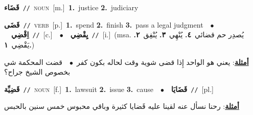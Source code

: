 \documentclass[10pt,a4paper,twoside]{article} %
\begin{document}
\begin{multicols}{2}
{\setlength\topsep{0pt}\textbf{\foreignlanguage{arabic}{قَضَاء}}\ {\color{gray}\texttt{//}\color{black}}\ \textsc{noun}\ [m.]\ \textbf{1.}~justice  \textbf{2.}~judiciary\ } \vspace{2mm}

{\setlength\topsep{0pt}\textbf{\foreignlanguage{arabic}{قَضَى}}\ {\color{gray}\texttt{//}\color{black}}\ \textsc{verb}\ [p.]\ \textbf{1.}~spend  \textbf{2.}~finish  \textbf{3.}~pass a legal judgment\ \ $\bullet$\ \ \setlength\topsep{0pt}\textbf{\foreignlanguage{arabic}{اِقْضِي}}\ {\color{gray}\texttt{//}\color{black}}\ [c.]\ \ $\bullet$\ \ \setlength\topsep{0pt}\textbf{\foreignlanguage{arabic}{يِقْضِي}}\ {\color{gray}\texttt{//}\color{black}}\ [i.]\ \color{gray}(msa. \foreignlanguage{arabic}{يُصدِر حم قضائي}~\foreignlanguage{arabic}{\textbf{٤.}}  \foreignlanguage{arabic}{يُنْهِي}~\foreignlanguage{arabic}{\textbf{٣.}}  \foreignlanguage{arabic}{يُنْفِق}~\foreignlanguage{arabic}{\textbf{٢.}}  \foreignlanguage{arabic}{يَقْضِي}~\foreignlanguage{arabic}{\textbf{١.}})\color{black}\  \begin{flushright}\color{gray}\foreignlanguage{arabic}{\textbf{\underline{\foreignlanguage{arabic}{أمثلة}}}: يعني هو الواحد إِذا قضى شوية وقت لحاله بكون كفر\ $\bullet$\ \  قضت المحكمة شي بخصوص الشيخ جراح؟}\end{flushright}\color{black}} \vspace{2mm}

{\setlength\topsep{0pt}\textbf{\foreignlanguage{arabic}{قَضِيِّة}}\ {\color{gray}\texttt{//}\color{black}}\ \textsc{noun}\ [f.]\ \textbf{1.}~lawsuit  \textbf{2.}~issue  \textbf{3.}~cause\ \ $\bullet$\ \ \setlength\topsep{0pt}\textbf{\foreignlanguage{arabic}{قَضَايَا}}\ {\color{gray}\texttt{//}\color{black}}\ [pl.]\  \begin{flushright}\color{gray}\foreignlanguage{arabic}{\textbf{\underline{\foreignlanguage{arabic}{أمثلة}}}: رحنا نسأل عنه لقينا عليه قَضايا كثيرة وباقي محبوس خمس سنين بالحبس}\end{flushright}\color{black}} \vspace{2mm}


\end{multicols}
\end{document}
